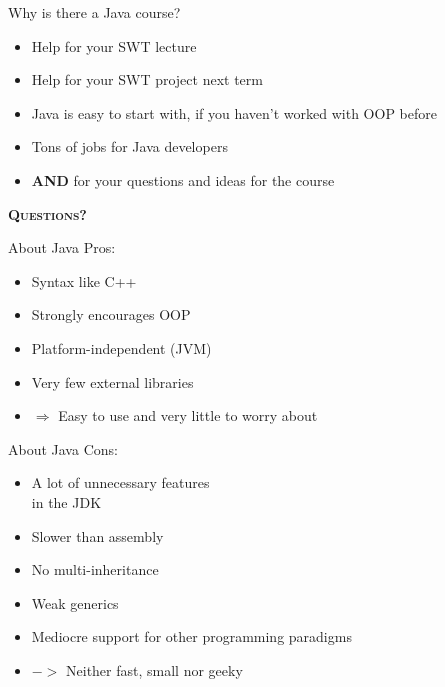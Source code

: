 \begin{frame}{Why is there a Java course?}
	\begin{itemize}
		\item Help for your SWT lecture
		\item Help for your SWT project next term
		\item Java is easy to start with, if you haven't worked with OOP before
		\item Tons of jobs for Java developers
		\item[] \textbf{AND} for your questions and ideas for the course
	\end{itemize}
\end{frame}

\begin{frame}[c]{}
	\centering
	\textsc{\Huge{\textbf{Questions?}}}
\end{frame}

\begin{frame}{About Java}
	Pros:
	\begin{itemize}
		\item Syntax like C++
		\item Strongly encourages OOP
		\item Platform-independent (JVM)
		\item Very few external libraries
		\item[] $\Rightarrow$ Easy to use and very little to worry about
	\end{itemize}
\end{frame}

\begin{frame}{About Java}
	Cons:
	\begin{itemize}
		\item A lot of unnecessary features \\ in the JDK
		\item Slower than assembly
		\item No multi-inheritance
		\item Weak generics
		\item Mediocre support for other programming paradigms
		\item[] $->$ Neither fast, small nor geeky
	\end{itemize}
\end{frame}

